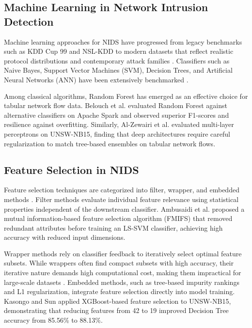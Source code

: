 \documentclass[conference]{IEEEtran}
\begin{document}
\subsection{Machine Learning in Network Intrusion Detection}
Machine learning approaches for NIDS have progressed from legacy benchmarks such as KDD Cup 99 and NSL-KDD to modern datasets that reflect realistic protocol distributions and contemporary attack families \cite{sharafaldin2018toward}. Classifiers such as Naive Bayes, Support Vector Machines (SVM), Decision Trees, and Artificial Neural Networks (ANN) have been extensively benchmarked \cite{ahmad2021network}. 

Among classical algorithms, Random Forest \cite{breiman2001random} has emerged as an effective choice for tabular network flow data. Belouch et al. \cite{belouch2018performance} evaluated Random Forest against alternative classifiers on Apache Spark and observed superior F1-scores and resilience against overfitting. Similarly, Al-Zewairi et al. \cite{alzewairi2017experimental} evaluated multi-layer perceptrons on UNSW-NB15, finding that deep architectures require careful regularization to match tree-based ensembles on tabular network flows.

\subsection{Feature Selection in NIDS}
Feature selection techniques are categorized into filter, wrapper, and embedded methods \cite{guyon2003introduction}. Filter methods evaluate individual feature relevance using statistical properties independent of the downstream classifier. Ambusaidi et al. \cite{ambusaidi2016building} proposed a mutual information-based feature selection algorithm (FMIFS) that removed redundant attributes before training an LS-SVM classifier, achieving high accuracy with reduced input dimensions.

Wrapper methods rely on classifier feedback to iteratively select optimal feature subsets. While wrappers often find compact subsets with high accuracy, their iterative nature demands high computational cost, making them impractical for large-scale datasets \cite{kasongo2020performance}. Embedded methods, such as tree-based impurity rankings and L1 regularization, integrate feature selection directly into model training. Kasongo and Sun \cite{kasongo2020performance} applied XGBoost-based feature selection to UNSW-NB15, demonstrating that reducing features from 42 to 19 improved Decision Tree accuracy from 85.56\% to 88.13\%.
\end{document}
